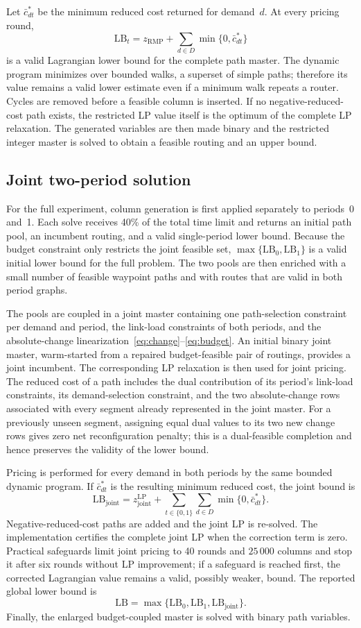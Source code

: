 Let $\bar c^*_{dt}$ be the minimum reduced cost returned for demand~$d$. At every pricing round,
\[
\mathrm{LB}_t=z_{\mathrm{RMP}}+\sum_{d\in D}\min\{0,\bar c^*_{dt}\}
\]
is a valid Lagrangian lower bound for the complete path master. The dynamic program minimizes over
bounded walks, a superset of simple paths; therefore its value remains a valid lower estimate even if
a minimum walk repeats a router. Cycles are removed before a feasible column is inserted. If no
negative-reduced-cost path exists, the restricted LP value itself is the optimum of the complete LP
relaxation. The generated variables are then made binary and the restricted integer master is solved
to obtain a feasible routing and an upper bound.

\subsection{Joint two-period solution}

For the full experiment, column generation is first applied separately to periods~0 and~1. Each solve
receives 40\% of the total time limit and returns an initial path pool, an incumbent routing, and a
valid single-period lower bound. Because the budget constraint only restricts the joint feasible set,
$\max\{\mathrm{LB}_0,\mathrm{LB}_1\}$ is a valid initial lower bound for the full problem. The two
pools are then enriched with a small number of feasible waypoint paths and with routes that are valid
in both period graphs.

The pools are coupled in a joint master containing one path-selection constraint per demand and
period, the link-load constraints of both periods, and the absolute-change
linearization~\eqref{eq:change}--\eqref{eq:budget}. An initial binary joint master, warm-started from
a repaired budget-feasible pair of routings, provides a joint incumbent. The corresponding LP
relaxation is then used for joint pricing. The reduced cost of a path includes the dual contribution
of its period's link-load constraints, its demand-selection constraint, and the two absolute-change
rows associated with every segment already represented in the joint master. For a previously unseen
segment, assigning equal dual values to its two new change rows gives zero net reconfiguration
penalty; this is a dual-feasible completion and hence preserves the validity of the lower bound.

Pricing is performed for every demand in both periods by the same bounded dynamic program. If
$\bar c^*_{dt}$ is the resulting minimum reduced cost, the joint bound is
\[
\mathrm{LB}_{\mathrm{joint}}=z^{\mathrm{LP}}_{\mathrm{joint}}+\sum_{t\in\{0,1\}}\sum_{d\in D}\min\{0,\bar c^*_{dt}\}.
\]
Negative-reduced-cost paths are added and the joint LP is re-solved. The implementation certifies the
complete joint LP when the correction term is zero. Practical safeguards limit joint pricing to 40
rounds and $25\,000$ columns and stop it after six rounds without LP improvement; if a safeguard is
reached first, the corrected Lagrangian value remains a valid, possibly weaker, bound. The reported
global lower bound is
\[
\mathrm{LB}=\max\{\mathrm{LB}_0,\mathrm{LB}_1,\mathrm{LB}_{\mathrm{joint}}\}.
\]
Finally, the enlarged budget-coupled master is solved with binary path variables.

